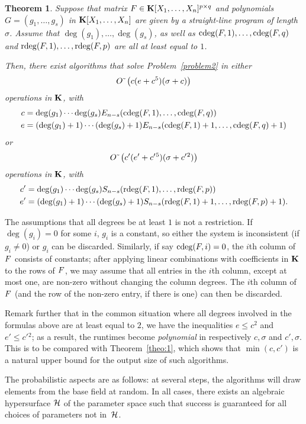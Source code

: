 \documentclass[12pt]{article}
\newtheorem{theorem}[definition]{Theorem}
\begin{document}
\begin{theorem}\label{theo:2}
  Suppose that matrix
  ${F} \in \mathbf{K}[X_1,\dots,X_n]^{p \times q}$ and polynomials
  $G=(g_1,\dots,g_s)$ in $\mathbf{K}[X_1,\dots,X_n]$ are given by a
  straight-line program of length $\sigma$. Assume that 
  $\deg(g_1),\dots,\deg(g_s)$, as well as $\mathrm{cdeg}({F},1), \ldots, \mathrm{cdeg}({F},q)$
  and $\mathrm{rdeg}({F},1), \ldots, \mathrm{rdeg}({F},p)$ are all at least equal to $1$.

  Then, there exist 
   algorithms that solve Problem~\ref{problem2} in either
 $${O}{\,\tilde{ }\,}\left (c(e+c^5 )(\sigma + c)\right)$$
  operations in $\mathbf{K}$, with
  \begin{align*}
  c&=\deg(g_1)\cdots\deg(g_s)E_{n-s}(\mathrm{cdeg}({F},1), \ldots, \mathrm{cdeg}({F},q))\\
  e&=(\deg(g_1)+1)\cdots(\deg(g_s)+1) E_{n-s}(\mathrm{cdeg}({F},1)+1, \ldots, \mathrm{cdeg}({F},q)+1)   
  \end{align*}
or 
$${O}{\,\tilde{ }\,}\left( c'(e'+{c'}{}^5 )(\sigma + {c'}{}^2) \right)$$
operations in $\mathbf{K}$, with 
\begin{align*}
c'&=\deg(g_1)\cdots\deg(g_s) S_{n-s}(\mathrm{rdeg}({F},1), \ldots, \mathrm{rdeg}({F},p))\\
e'&=(\deg(g_1)+1)\cdots(\deg(g_s)+1)S_{n-s}(\mathrm{rdeg}({F},1)+1, \ldots, \mathrm{rdeg}({F},p)+1).
\end{align*}
\end{theorem}
The assumptions that all degrees be at least $1$ is not a restriction.
If $\deg(g_i)=0$ for some $i$, $g_i$ is a constant, so either the
system is inconsistent (if $g_i \ne 0$) or $g_i$ can be
discarded. Similarly, if say $\mathrm{cdeg}({F},i)=0$, the $i$th column of
${F}$ consists of constants; after applying linear combinations with
coefficients in $\mathbf{K}$ to the rows of ${F}$, we may assume that all
entries in the $i$th column, except at most one, are non-zero without
changing the column degrees. The $i$th column of ${F}$ (and the row of
the non-zero entry, if there is one) can then be discarded.

Remark further that in the common situation where all degrees involved in the
formulas above are at least equal to $2$, we have the inequalities $e
\le c^2$ and $e' \le {c'}{}^2$; as a result, the runtimes become {\em
  polynomial} in respectively $c,\sigma$ and $c',\sigma$. This is to be 
compared with Theorem~\ref{theo:1}, which shows that 
$\min(c,c')$ is a natural upper bound for the output size of such algorithms.

The probabilistic aspects are as follows: at several steps, the
algorithms will draw elements from the base field at random. In all
cases, there exists an algebraic hypersurface $\cal H$ of the parameter
space such that success is guaranteed for all choices of parameters not
in~$\cal H$.
\end{document}
